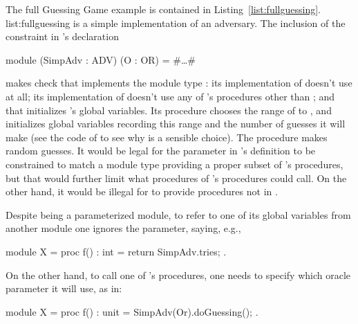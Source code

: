 The full Guessing Game example is contained in Listing~\ref{list:fullguessing}.
 {}{list:fullguessing}
 is a simple implementation of an adversary.
The inclusion of the constraint  in 's declaration
\begin{easycrypt}{}{}
module (SimpAdv : ADV) (O : OR) = #\ldots#
\end{easycrypt}
makes \EasyCrypt check that  implements the module type
: its implementation of  doesn't use  at
all; its implementation of  doesn't use any of 's
procedures other than ; and that 
initializes 's global variables.  Its 
procedure chooses the range of  to , and initializes
global variables recording this range and the number of guesses it
will make (see the code of  to see why  is a sensible
choice). The  procedure makes  random guesses.
It would be legal for the parameter  in 's
definition to be constrained to match a module type  providing
a proper subset of 's procedures, but that would further limit
what procedures of  's procedures
could call. On the other hand, it would be illegal for  to
provide procedures not in .

Despite  being a parameterized module, to refer to one
of its global variables from another module one ignores the parameter,
saying, e.g.,
\begin{easycrypt}{}{}
module X = {
  proc f() : int = {
    return SimpAdv.tries;
  }
}.
\end{easycrypt}
On the other hand, to call one of 's procedures, one needs
to specify which oracle parameter it will use, as in:
\begin{easycrypt}{}{}
module X = {
  proc f() : unit = {
    SimpAdv(Or).doGuessing();
  }
}.
\end{easycrypt}

